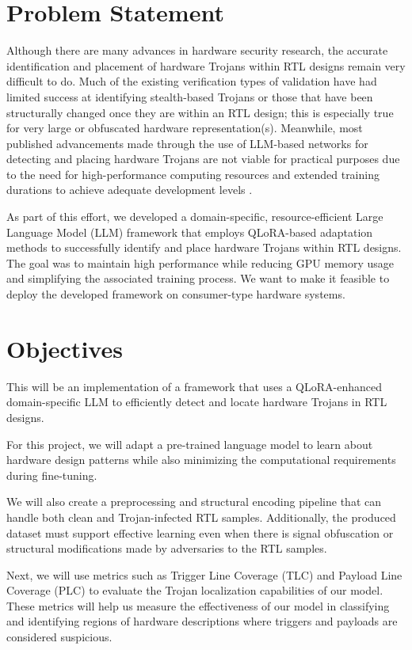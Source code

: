 \documentclass[12pt,a4paper]{report}
\begin{document}
\section{Problem Statement}

Although there are many advances in hardware security research, the accurate identification and placement of hardware Trojans within RTL designs remain very difficult to do. Much of the existing verification types of validation have had limited success at identifying stealth-based Trojans or those that have been structurally changed once they are within an RTL design; this is especially true for very large or obfuscated hardware representation(s). Meanwhile, most published advancements made through the use of LLM-based networks for detecting and placing hardware Trojans are not viable for practical purposes due to the need for high-performance computing resources and extended training durations to achieve adequate development levels \cite{ref1,ref3,ref5}.

As part of this effort, we developed a domain-specific, resource-efficient Large Language Model (LLM) framework that employs QLoRA-based adaptation methods to successfully identify and place hardware Trojans within RTL designs. The goal was to maintain high performance while reducing GPU memory usage and simplifying the associated training process. We want to make it feasible to deploy the developed framework on consumer-type hardware systems.

\section{Objectives}

This will be an implementation of a framework that uses a QLoRA-enhanced domain-specific LLM to efficiently detect and locate hardware Trojans in RTL designs.

For this project, we will adapt a pre-trained language model to learn about hardware design patterns while also minimizing the computational requirements during fine-tuning.

We will also create a preprocessing and structural encoding pipeline that can handle both clean and Trojan-infected RTL samples. Additionally, the produced dataset must support effective learning even when there is signal obfuscation or structural modifications made by adversaries to the RTL samples.

Next, we will use metrics such as Trigger Line Coverage (TLC) and Payload Line Coverage (PLC) to evaluate the Trojan localization capabilities of our model. These metrics will help us measure the effectiveness of our model in classifying and identifying regions of hardware descriptions where triggers and payloads are considered suspicious.
\end{document}
